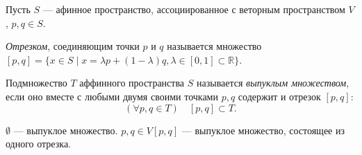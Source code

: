 
\begin{definition}
	Пусть $S$ --- афинное пространство, ассоциированное с веторным пространством $V$, $p, q \in S$.
	
	\textit{Отрезком}, соединяющим точки $p$ и $q$ называется множество $[p, q] = \{x \in S \mid x = \lambda p + (1 - \lambda) q, \lambda \in [0, 1] \subset \mathbb{R}\}$.
\end{definition}

\begin{definition}
	Подмножество $T$ аффинного пространства $S$ называется \textit{выпуклым множеством}, если оно вместе с любыми двумя своими точками $p, q$ содержит и отрезок $[p, q]$:
	\begin{equation*}
		(\forall p, q \in T) \quad [p, q] \subset T.
	\end{equation*}
	
	\begin{figure}[H]
		\centering 
		
	\end{figure}
	
	$\emptyset$ --- выпуклое множество.
	$p, q \in V [p, q]$ --- выпуклое множество, состоящее из одного отрезка.
\end{definition}

